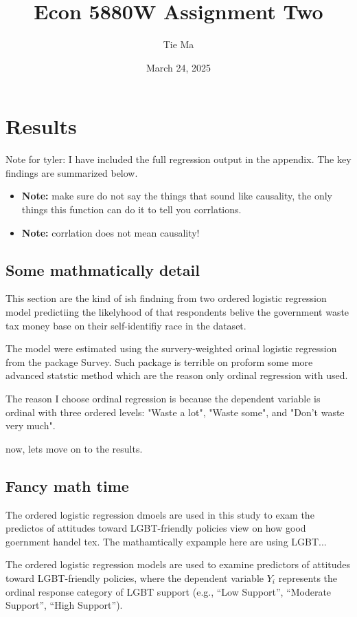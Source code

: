 \documentclass{article}
\begin{document}
\title{Econ 5880W Assignment Two}
\author{Tie Ma}
\date{March 24, 2025}
\maketitle

\section{Results}
Note for tyler: I have included the full regression output in the appendix. The key findings are summarized below.
\begin{itemize}
    \item \textbf{Note:} make sure do not say the things that sound like causality, the only things this function can do it to tell you corrlations.
    \item  \textbf{Note:} corrlation does not mean causality!
\end{itemize}


\subsection{Some mathmatically detail}

This section are the kind of ish findning from two ordered logistic regression model predictiing the likelyhood
of that respondents belive the government waste tax money base on their self-identifiy race in the dataset. 

The model were estimated using the survery-weighted orinal logistic regression from the package Survey.
Such package is terrible on proform some more advanced statstic method which are the reason only ordinal regression with used. 

The reason I choose ordinal regression is because the dependent variable is ordinal with three ordered levels: "Waste a lot", "Waste some", and "Don't waste very much".

now, lets move on to the results.



\subsection{Fancy math time}
The ordered logistic regression dmoels are used in this study to exam the predictos of attitudes toward LGBT-friendly policies view on how good goernment handel tex.
The mathamtically expample here are using LGBT...

The ordered logistic regression models are used to examine predictors of attitudes toward LGBT-friendly policies, where the dependent variable \( Y_i \) represents the ordinal response category of LGBT support (e.g., ``Low Support'', ``Moderate Support'', ``High Support'').
\end{document}
